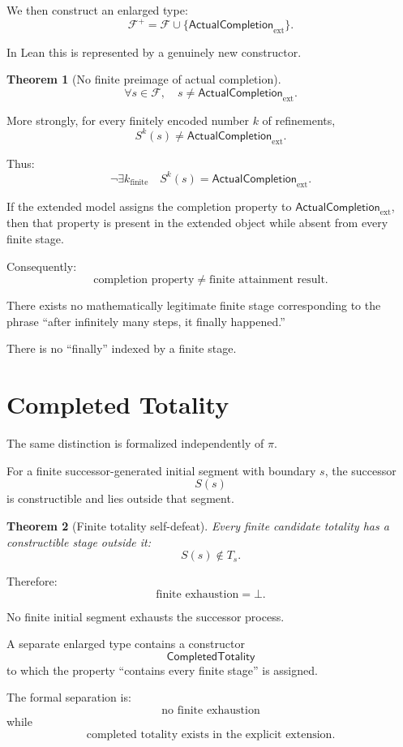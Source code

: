 \documentclass[11pt,a4paper]{article}
\newtheorem{theorem}{Theorem}
\newcommand{\ExternalCompletion}{\mathsf{ActualCompletion}_{\mathrm{ext}}}
\newcommand{\CompletedTotality}{\mathsf{CompletedTotality}}
\newcommand{\False}{\bot}
\begin{document}
We then construct an enlarged type:
\[
\mathcal F^+
=
\mathcal F
\cup
\{\ExternalCompletion\}.
\]

In Lean this is represented by a genuinely new constructor.

\begin{theorem}[No finite preimage of actual completion]
\[
\boxed{
\forall s\in\mathcal F,
\quad
s\neq\ExternalCompletion.
}
\]
\end{theorem}

More strongly, for every finitely encoded number $k$ of refinements,
\[
\boxed{
S^k(s)\neq\ExternalCompletion.
}
\]

Thus:
\[
\neg\exists k_{\mathrm{finite}}
\quad
S^k(s)=\ExternalCompletion.
\]

If the extended model assigns the completion property to
$\ExternalCompletion$, then that property is present in the extended
object while absent from every finite stage.

Consequently:
\[
\boxed{
\text{completion property}
\neq
\text{finite attainment result}.
}
\]

There exists no mathematically legitimate finite stage corresponding to
the phrase ``after infinitely many steps, it finally happened.''

There is no ``finally'' indexed by a finite stage.

\section{Completed Totality}

The same distinction is formalized independently of $\pi$.

For a finite successor-generated initial segment with boundary $s$,
the successor
\[
S(s)
\]
is constructible and lies outside that segment.

\begin{theorem}[Finite totality self-defeat]
Every finite candidate totality has a constructible stage outside it:
\[
\boxed{
S(s)\notin T_s.
}
\]
\end{theorem}

Therefore:
\[
\boxed{
\text{finite exhaustion}=\False.
}
\]

No finite initial segment exhausts the successor process.

A separate enlarged type contains a constructor
\[
\CompletedTotality
\]
to which the property ``contains every finite stage'' is assigned.

The formal separation is:
\[
\boxed{
\text{no finite exhaustion}
}
\]
while
\[
\boxed{
\text{completed totality exists in the explicit extension}.
}
\]
\end{document}
